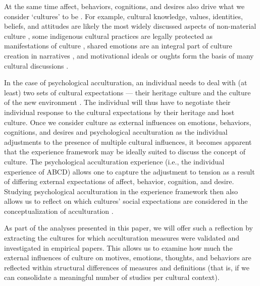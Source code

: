 \documentclass[man, 12pt, a4paper]{apa7}
\begin{document}
At the same time affect, behaviors, cognitions, and desires also drive what we consider `cultures' to be \citep[e.g.,][]{Varnum2017}. For example, cultural knowledge, values, identities, beliefs, and attitudes are likely the most widely discussed aspects of non-material culture \citep[e.g.,][]{DiMaggio1997}, some indigenous cultural practices are legally protected as manifestations of culture \citep[Art. 11]{UnitedNations2007}, shared emotions are an integral part of culture creation in narratives \citep[e.g.,][]{Ahmed2014, Kitayama1994, Smith2016c, Sundararajan2015}, and motivational ideals or oughts form the basis of many cultural discussions \citep[e.g., see][]{Markus1991}.

In the case of psychological acculturation, an individual needs to deal with (at least) two sets of cultural expectations --- their heritage culture and the culture of the new environment \citep[e.g., see models of][]{Berry1997b, Berry2006a}. The individual will thus have to negotiate their individual response to the cultural expectations by their heritage and host culture. Once we consider culture as external influences on emotions, behaviors, cognitions, and desires and psychological acculturation as the individual adjustments to the presence of multiple cultural influences, it becomes apparent that the experience framework may be ideally suited to discuss the concept of culture. The psychological acculturation experience (i.e., the individual experience of ABCD) allows one to capture the adjustment to tension as a result of differing external expectations of affect, behavior, cognition, and desire. Studying psychological acculturation in the experience framework then also allows us to reflect on which cultures' social expectations are considered in the conceptualization of acculturation \citep{Bhatia2001}. 

As part of the analyses presented in this paper, we will offer such a reflection by extracting the cultures for which acculturation measures were validated and investigated in empirical papers. This allows us to examine how much the external influences of culture on motives, emotions, thoughts, and behaviors are reflected within structural differences of measures and definitions (that is, if we can consolidate a meaningful number of studies per cultural context).
\end{document}
